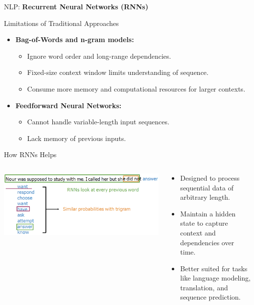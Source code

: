 \begin{frame}{}
    \LARGE NLP: \textbf{Recurrent Neural Networks (RNNs)}
\end{frame}

\begin{frame}{Limitations of Traditional Approaches}
    \begin{itemize}
        \item \textbf{Bag-of-Words and n-gram models:}
        \begin{itemize}
            \item Ignore word order and long-range dependencies.
            \item Fixed-size context window limits understanding of sequence.
            \item Consume more memory and computational resources for larger contexts.
        \end{itemize}
        \item \textbf{Feedforward Neural Networks:}
        \begin{itemize}
            \item Cannot handle variable-length input sequences.
            \item Lack memory of previous inputs.
        \end{itemize}
    \end{itemize}
\end{frame}

\begin{frame}[t]{How RNNs Helps}
    \begin{columns}
        \begin{column}{0.6\textwidth}
            \centering
            \includegraphics[width=1.1\linewidth]{images/nlp/rnn-advantage.png}  
        \end{column}
        \begin{column}{0.4\textwidth}
            \begin{itemize}
                \setlength{\itemsep}{1.5em}
                \item Designed to process sequential data of arbitrary length.
                \item Maintain a hidden state to capture context and dependencies over time.
                \item Better suited for tasks like language modeling, translation, and sequence prediction.
            \end{itemize}
        \end{column}
    \end{columns}
\end{frame}

